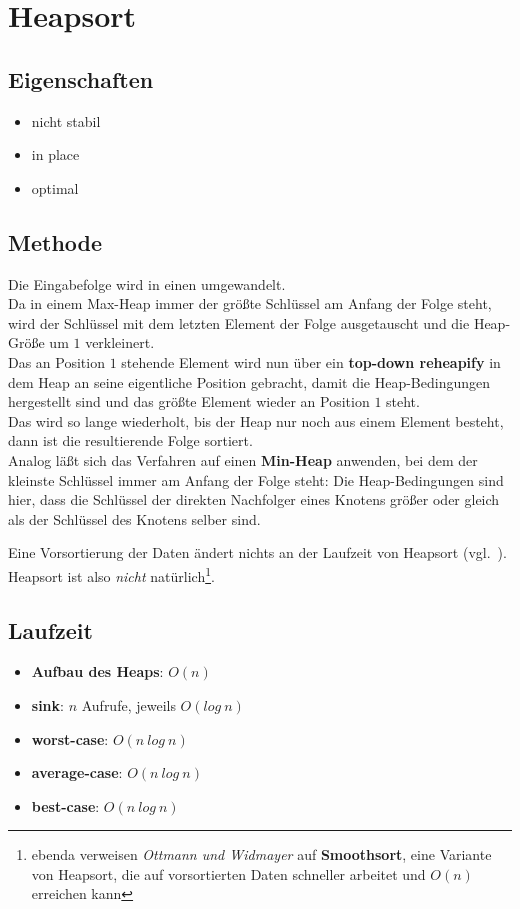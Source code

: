 \section{Heapsort}

\subsection{Eigenschaften}
\begin{itemize}
    \item nicht stabil
    \item in place
    \item optimal
\end{itemize}

\subsection{Methode}
Die Eingabefolge wird in einen  umgewandelt.\\
Da in einem Max-Heap immer der größte Schlüssel am Anfang der Folge steht, wird der Schlüssel mit dem letzten Element der Folge ausgetauscht und die Heap-Größe um $1$ verkleinert.\\
Das an Position $1$ stehende Element wird nun über ein \textbf{top-down reheapify} in dem Heap an seine eigentliche Position gebracht, damit die Heap-Bedingungen hergestellt sind und das größte Element wieder an Position $1$ steht.\\
Das wird so lange wiederholt, bis der Heap nur noch aus einem Element besteht, dann ist die resultierende Folge sortiert.\\

\noindent
Analog läßt sich das Verfahren auf einen \textbf{Min-Heap} anwenden, bei dem der kleinste Schlüssel immer am Anfang der Folge steht: Die Heap-Bedingungen sind hier, dass die Schlüssel der direkten Nachfolger eines Knotens größer oder gleich als der Schlüssel des Knotens selber sind.

\noindent
Eine Vorsortierung der Daten ändert nichts an der Laufzeit von Heapsort (vgl.~\cite[112]{OW17b}). Heapsort ist also \textit{nicht} natürlich\footnote{
ebenda verweisen \textit{Ottmann und Widmayer} auf \textbf{Smoothsort}, eine Variante von Heapsort, die auf vorsortierten Daten schneller arbeitet und $O(n)$ erreichen kann
}.

\subsection{Laufzeit}
\begin{itemize}
    \item \textbf{Aufbau des Heaps}: $O(n)$
    \item \textbf{sink}: $n$ Aufrufe, jeweils $O(log\ n)$
    \item \textbf{worst-case}: $O(n\ log\ n)$
    \item \textbf{average-case}: $O(n\ log\ n)$
    \item \textbf{best-case}: $O(n\ log\ n)$
\end{itemize}

